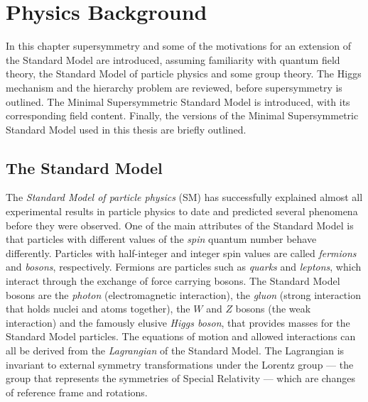 \documentclass[twoside,english]{uiofysmaster}
\makeatletter
\newenvironment{chapquote}[2][2em]
  {\setlength{\@tempdima}{#1}%
   \def\chapquote@author{#2}%
   \parshape 1 \@tempdima \dimexpr\textwidth-2\@tempdima\relax%
   \itshape}
  {\par\normalfont\hfill--\ \chapquote@author\hspace*{\@tempdima}\par\bigskip}
\makeatother
\begin{document}
\chapter{Physics Background}\label{Chapter:Physics Background}

 

In this chapter supersymmetry and some of the motivations for an extension of the Standard Model are introduced, assuming familiarity with quantum field theory, the Standard Model of particle physics and some group theory. The Higgs mechanism and the hierarchy problem are reviewed, before supersymmetry is outlined. The Minimal Supersymmetric Standard Model is introduced, with its corresponding field content. Finally, the versions of the Minimal Supersymmetric Standard Model used in this thesis are briefly outlined.

\section{The Standard Model}

The \textit{Standard Model of particle physics} (SM) has successfully explained almost all experimental results in particle physics to date and predicted several phenomena before they were observed. One of the main attributes of the Standard Model is that particles with different values of the \textit{spin} quantum number behave differently. Particles with half-integer and integer spin values are called \textit{fermions} and \textit{bosons}, respectively. Fermions are particles such as \textit{quarks} and \textit{leptons}, which interact through the exchange of force carrying bosons. The Standard Model bosons are the \textit{photon} (electromagnetic interaction), the \textit{gluon} (strong interaction that holds nuclei and atoms together), the $W$ and $Z$ bosons (the weak interaction) and the famously elusive \textit{Higgs boson}, that provides masses for the Standard Model particles. The equations of motion and allowed interactions can all be derived from the \textit{Lagrangian} of the Standard Model. The Lagrangian is invariant to external symmetry transformations under the Lorentz group --- the group that represents the symmetries of Special Relativity --- which are changes of reference frame and rotations. 
\end{document}
